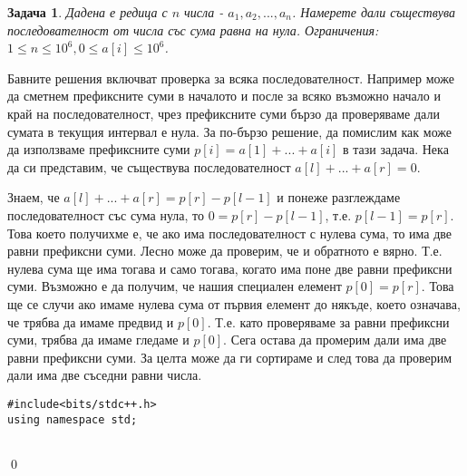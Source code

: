 \documentclass[]{article}
\newtheorem{problem}{Задача}
\newenvironment{solution}{\noindent{\bf Решение.}\hspace*{1em}}{\qed\par}
\begin{document}
\begin{problem}
Дадена е редица с $n$ числа - $a_1,a_2,...,a_n$. Намерете дали съществува последователност от числа със сума равна на нула.\newline
Ограничения: $1\leq n\leq 10^6,0 \leq a[i]\leq 10^6$.
\end{problem}
\begin{solution}
Бавните решения включват проверка за всяка последователност. Например може да сметнем префиксните суми в началото и после за всяко възможно начало и край на последователност, чрез префиксните суми бързо да проверяваме дали сумата в текущия интервал е нула.\newline
За по-бързо решение, да помислим как може да използваме префиксните суми $p[i]=a[1]+...+a[i]$ в тази задача. Нека да си представим, че съществува последователност $a[l]+...+a[r]=0$.
\newline

\newline

\newline\newline
Знаем, че $a[l]+...+a[r]=p[r]-p[l-1]$ и понеже разглеждаме последователност със сума нула, то $0=p[r]-p[l-1]$, т.е. $p[l-1]=p[r]$. Това което получихме е, че ако има последователност с нулева сума, то има две равни префиксни суми. Лесно може да проверим, че и обратното е вярно. Т.е. нулева сума ще има тогава и само тогава, когато има поне две равни префиксни суми.\newline
Възможно е да получим, че нашия специален елемент $p[0]=p[r]$. Това ще се случи ако имаме нулева сума от първия елемент до някъде, което означава, че трябва да имаме предвид и $p[0]$. Т.е. като проверяваме за равни префиксни суми, трябва да имаме гледаме и $p[0]$.\newline
Сега остава да промерим дали има две равни префиксни суми. За целта може да ги сортираме и след това да проверим дали има две съседни равни числа.
\begin{verbatim}
#include<bits/stdc++.h>
using namespace std;


\end{verbatim}
\end{solution}
\end{document}
